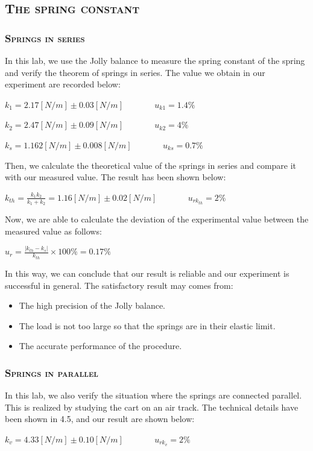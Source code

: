 \documentclass[a4paper,12pt]{article}
\begin{document}
\subsection{\textsc{The spring constant}}
\subsubsection{\textsc{Springs in series}}
In this lab, we use the Jolly balance to measure the spring constant of the spring and verify the theorem of springs in series. The value we obtain in our experiment are recorded below:
\begin{center}
$ k_1 = 2.17 [N/m] \pm 0.03 [N/m] $ ~~~~~~ $ u_{k1} = 1.4\% $
\end{center}
\begin{center}
$ k_2 = 2.47 [N/m] \pm 0.09 [N/m] $ ~~~~~~ $ u_{k2} = 4\% $
\end{center}
\begin{center}
$ k_s = 1.162[N/m] \pm 0.008[N/m] $ ~~~~~~ $ u_{ks} = 0.7\% $
\end{center}
\par Then, we calculate the theoretical value of the springs in series and compare it with our measured value. The result has been shown below:
\begin{center}
$\displaystyle  k_{th} = \frac{k_1k_2}{k_1+k_2} = 1.16 [N/m] \pm 0.02 [N/m]$ ~~~~~~ $ u_{rk_{th}} = 2\% $
\end{center}
\par Now, we are able to calculate the deviation of the experimental value between the measured value as follows:
\begin{center}
$ \displaystyle u_{r} = \frac{|k_{th} - k_s|}{k_{th}}\times 100\% = 0.17 \% $
\end{center}
In this way, we can conclude that our result is reliable and our experiment is successful in general. The satisfactory result may comes from:
\begin{itemize}
\item The high precision of the Jolly balance.
\item The load is not too large so that the springs are in their elastic limit. 
\item The accurate performance of the procedure.
\end{itemize}
\subsubsection{\textsc{Springs in parallel}}
In this lab, we also verify the situation where the springs are connected parallel. This is realized by studying the cart on an air track. The technical details have been shown in 4.5, and our result are shown below:
\begin{center}
$ k_v = 4.33 [N/m] \pm 0.10 [N/m] $ ~~~~~~ $ u_{rk_v} = 2\% $
\end{center}
\end{document}
